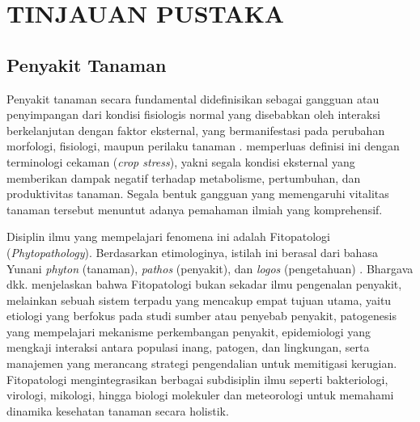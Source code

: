 
\chapter{TINJAUAN PUSTAKA}
\section{Penyakit Tanaman}
Penyakit tanaman secara fundamental didefinisikan sebagai gangguan atau penyimpangan dari kondisi fisiologis normal yang disebabkan oleh interaksi berkelanjutan dengan faktor eksternal, yang bermanifestasi pada perubahan morfologi, fisiologi, maupun perilaku tanaman \parencite{vishnoiPlantDiseaseDetection2021}. \textcite{muhammadComprehensiveReviewCrop2025} memperluas definisi ini dengan terminologi cekaman (\textit{crop stress}), yakni segala kondisi eksternal yang memberikan dampak negatif terhadap metabolisme, pertumbuhan, dan produktivitas tanaman. Segala bentuk gangguan yang memengaruhi vitalitas tanaman tersebut menuntut adanya pemahaman ilmiah yang komprehensif.

Disiplin ilmu yang mempelajari fenomena ini adalah Fitopatologi (\textit{Phytopathology}). Berdasarkan etimologinya, istilah ini berasal dari bahasa Yunani \textit{phyton} (tanaman), \textit{pathos} (penyakit), dan \textit{logos} (pengetahuan) \parencite{bhargavaPlantLeafDisease2024}. Bhargava dkk. menjelaskan bahwa Fitopatologi bukan sekadar ilmu pengenalan penyakit, melainkan sebuah sistem terpadu yang mencakup empat tujuan utama, yaitu etiologi yang berfokus pada studi sumber atau penyebab penyakit, patogenesis yang mempelajari mekanisme perkembangan penyakit, epidemiologi yang mengkaji interaksi antara populasi inang, patogen, dan lingkungan, serta manajemen yang merancang strategi pengendalian untuk memitigasi kerugian. Fitopatologi mengintegrasikan berbagai subdisiplin ilmu seperti bakteriologi, virologi, mikologi, hingga biologi molekuler dan meteorologi untuk memahami dinamika kesehatan tanaman secara holistik.

